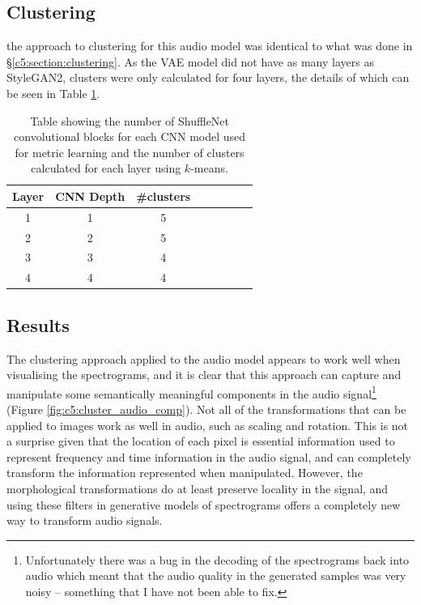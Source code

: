 \subsection{Clustering}

the approach to clustering for this audio model was identical to what was done in \S \ref{c5:section:clustering}.
As the VAE model did not have as many layers as StyleGAN2, clusters were only calculated for four layers, the details of which can be seen in Table \ref{tab:c5:audio-clustering}.

\begin{table}[]
    \centering
    \begin{tabular}{|c|c|c|c|c|c|c|c|}
    \hline
    Layer & CNN Depth & \#clusters \\
    \hline
    1     & 1 &   5 \\
    2     & 2 &   5 \\
    3     & 3 &   4 \\
    4     & 4 &  4 \\
    \hline
    \end{tabular}
    \medskip
    \caption{\label{tab:c5:audio-clustering}Table showing the number of ShuffleNet \citep{zhang2018shufflenet} convolutional blocks for each CNN model used for metric learning and the number of clusters calculated for each layer using $k$-means.
    }
    \end{table}

\subsection{Results}

The clustering approach applied to the audio model appears to work well when visualising the spectrograms, and it is clear that this approach can capture and manipulate some semantically meaningful components in the audio signal\footnote{Unfortunately there was a bug in the decoding of the spectrograms back into audio which meant that the audio quality in the generated samples was very noisy -- something that I have not been able to fix.} (Figure \ref{fig:c5:cluster_audio_comp}). 
Not all of the transformations that can be applied to images work as well in audio, such as scaling and rotation.
This is not a surprise given that the location of each pixel is essential information used to represent frequency and time information in the audio signal, and can completely transform the information represented when manipulated.
However, the morphological transformations do at least preserve locality in the signal, and using these filters in generative models of spectrograms offers a completely new way to transform audio signals.

